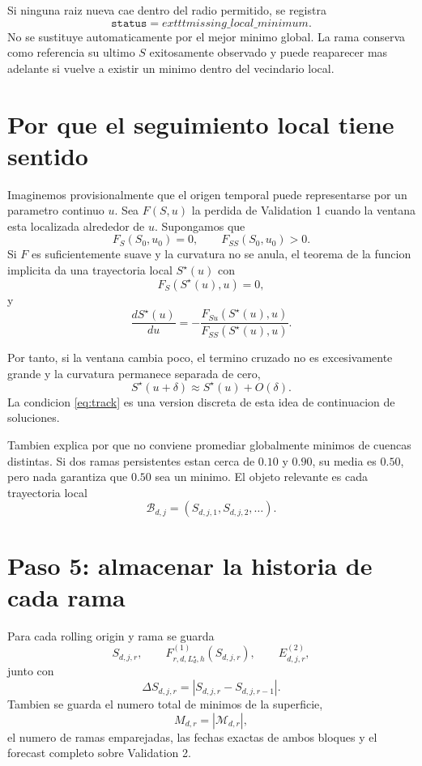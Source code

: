 \documentclass[11pt]{article}
\begin{document}
Si ninguna raiz nueva cae dentro del radio permitido, se registra
\[
\texttt{status}=	exttt{missing\_local\_minimum}.
\]
No se sustituye automaticamente por el mejor minimo global. La rama conserva
como referencia su ultimo \(S\) exitosamente observado y puede reaparecer mas
adelante si vuelve a existir un minimo dentro del vecindario local.

\section{Por que el seguimiento local tiene sentido}

Imaginemos provisionalmente que el origen temporal puede representarse por un
parametro continuo \(u\). Sea \(F(S,u)\) la perdida de Validation 1 cuando la
ventana esta localizada alrededor de \(u\). Supongamos que
\[
F_S(S_0,u_0)=0,
\qquad
F_{SS}(S_0,u_0)>0.
\]
Si \(F\) es suficientemente suave y la curvatura no se anula, el teorema de la
funcion implicita da una trayectoria local \(S^\star(u)\) con
\[
F_S(S^\star(u),u)=0,
\]
y
\begin{equation}
\frac{dS^\star(u)}{du}
=
-
\frac{F_{Su}(S^\star(u),u)}
{F_{SS}(S^\star(u),u)}.
\label{eq:implicit}
\end{equation}

Por tanto, si la ventana cambia poco, el termino cruzado no es excesivamente
grande y la curvatura permanece separada de cero,
\[
S^\star(u+\delta)
\approx
S^\star(u)+O(\delta).
\]
La condicion \eqref{eq:track} es una version discreta de esta idea de
continuacion de soluciones.

Tambien explica por que no conviene promediar globalmente minimos de cuencas
distintas. Si dos ramas persistentes estan cerca de \(0.10\) y \(0.90\), su
media es \(0.50\), pero nada garantiza que \(0.50\) sea un minimo. El objeto
relevante es cada trayectoria local
\[
\mathcal{B}_{d,j}
=
(S_{d,j,1},S_{d,j,2},\ldots).
\]

\section{Paso 5: almacenar la historia de cada rama}

Para cada rolling origin y rama se guarda
\[
S_{d,j,r},
\qquad
F^{(1)}_{r,d,L_d^\star,h}(S_{d,j,r}),
\qquad
E^{(2)}_{d,j,r},
\]
junto con
\[
\Delta S_{d,j,r}
=
|S_{d,j,r}-S_{d,j,r-1}|.
\]
Tambien se guarda el numero total de minimos de la superficie,
\[
M_{d,r}=|\mathcal{M}_{d,r}|,
\]
el numero de ramas emparejadas, las fechas exactas de ambos bloques y el
forecast completo sobre Validation 2.
\end{document}
